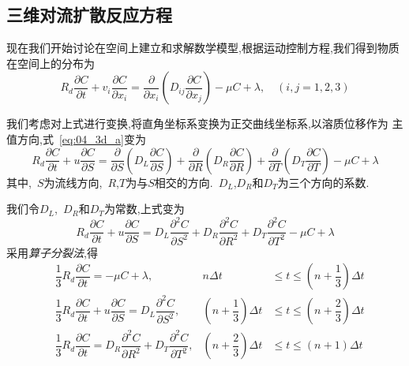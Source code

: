 \subsection{三维对流扩散反应方程}
现在我们开始讨论在空间上建立和求解数学模型,根据运动控制方程,我们得到物质在空间上的分布为
\begin{equation}\label{eq:04_3d_a}
R_d\dfrac{\partial C}{\partial t}+v_i\dfrac{\partial C}{\partial x_i}=\dfrac{\partial}{\partial x_i}(D_{ij}\dfrac{\partial C}
{\partial x_j})-\mu C+\lambda,\quad (i,j=1,2,3)
\end{equation}\par
我们考虑对上式进行变换,将直角坐标系变换为正交曲线坐标系,以溶质位移作为
主值方向,式~\eqref{eq:04_3d_a}变为
\begin{equation}
R_d\dfrac{\partial C}{\partial t}+u\dfrac{\partial C}
{\partial S}=\dfrac{\partial}{\partial S}(D_L\dfrac{\partial C}{\partial S})
+\dfrac{\partial}{\partial R}(D_R\dfrac{\partial C}{\partial R})
+\dfrac{\partial}{\partial T}(D_T\dfrac{\partial C}{\partial T})-\mu C+\lambda
\end{equation}
其中,~$S$为流线方向,~$R$,$T$为与$S$相交的方向.~$D_L$,$D_R$和$D_T$为三个方向的系数.\par
我们令$D_L$,~$D_R$和$D_T$为常数,上式变为
\begin{equation}
R_d\dfrac{\partial C}{\partial t}+u\dfrac{\partial C}
{\partial S}=D_L\dfrac{\partial^2 C}{\partial S^2}+D_R\dfrac{\partial^2 C}{\partial R^2}+
D_T\dfrac{\partial^2 C}{\partial T^2}-\mu C+\lambda
\end{equation}
采用\emph{算子分裂法},得
\begin{align}
&\dfrac{1}{3}R_d\dfrac{\partial C}{\partial t}=-\mu C+\lambda , & n\Delta t&\leq t\leq(n+\dfrac{1}{3})\Delta t \label{eq:04_3d_p1}\\
&\dfrac{1}{3}R_d\dfrac{\partial C}{\partial t}+ u\dfrac{\partial C}{\partial S}=D_L\dfrac{\partial^2 C}{\partial S^2}, & (n+\dfrac{1}{3})\Delta t&\leq t\leq (n+\dfrac{2}{3})\Delta t \label{eq:04_3d_p2}\\
&\dfrac{1}{3}R_d\dfrac{\partial C}{\partial t}=D_R\dfrac{\partial^2 C}{\partial R^2}+D_T\dfrac{\partial^2 C}{\partial T^2},& (n+\dfrac{2}{3})\Delta t&\leq t\leq(n+1)\Delta t \label{eq:04_3d_p3}
\end{align}
